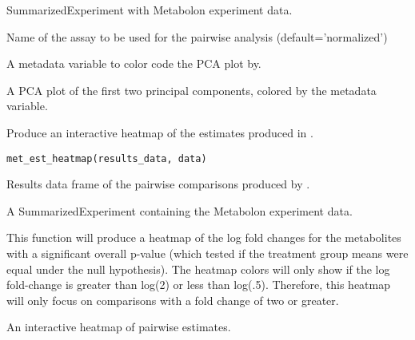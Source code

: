 \documentclass[a4paper]{book}
\begin{document}
%
\begin{Arguments}
\begin{ldescription}
\item[\code{data}] SummarizedExperiment with Metabolon experiment data.

\item[\code{Assay}] Name of the assay to be used for the pairwise analysis (default='normalized')

\item[\code{meta\_var}] A metadata variable to color code the PCA plot by.
\end{ldescription}
\end{Arguments}
%
\begin{Value}
A PCA plot of the first two principal components, colored by the metadata
variable.
\end{Value}
%
\begin{Description}
Produce an interactive heatmap of the estimates produced in .
\end{Description}
%
\begin{Usage}
\begin{verbatim}
met_est_heatmap(results_data, data)
\end{verbatim}
\end{Usage}
%
\begin{Arguments}
\begin{ldescription}
\item[\code{results\_data}] Results data frame of the pairwise comparisons produced by .

\item[\code{data}] A SummarizedExperiment containing the Metabolon experiment data.
\end{ldescription}
\end{Arguments}
%
\begin{Details}
This function will produce a heatmap of the log fold changes for the metabolites
with a significant overall p-value (which tested if the treatment group means
were equal under the null hypothesis). The heatmap colors will only show if
the log fold-change is greater than log(2) or less than log(.5). Therefore,
this heatmap will only focus on comparisons with a fold change of two or greater.
\end{Details}
%
\begin{Value}
An interactive heatmap of pairwise estimates.
\end{Value}
\end{document}
